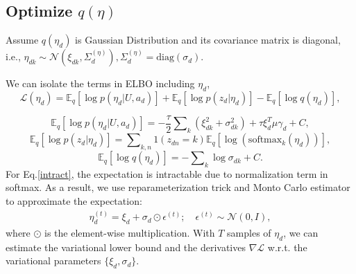 \documentclass[sigconf]{acmart}
\renewcommand*{\bm}[1]{#1}%
\begin{document}
\begin{appendices}
\subsection{Optimize $q(\bm{\eta})$}
Assume $q(\bm{\eta}_d)$ is Gaussian Distribution and its covariance matrix is diagonal, i.e., $\eta_{dk} \sim \mathcal{N}(\xi_{dk}, \Sigma_{d}^{(\eta)}), \Sigma_{d}^{(\eta)} = \text{diag}(\bm{\sigma}_d)$.

We can isolate the terms in ELBO including $\bm{\eta}_d$,
\begin{equation}
\label{ }
\mathcal{L}(\bm{\eta}_d) = \mathbb{E}_q\left[\log p(\bm{\eta}_d | \bm{U}, \bm{a}_d)\right] + \mathbb{E}_q\left[\log p(\bm{z}_d | \bm{\eta}_d) \right] - \mathbb{E}_q\left[\log q(\bm{\eta}_d) \right],
\end{equation}

\begin{equation}
\label{ }
\mathbb{E}_q\left[\log p(\bm{\eta}_d | \bm{U}, \bm{a}_d)\right] = -\frac{\tau}{2}\sum\nolimits_k(\xi_{dk}^2 + \sigma_{dk}^2) + \tau\bm{\xi}_d^T\bm{\mu}\bm{\gamma}_d + C,
\end{equation}
\begin{equation}
\label{intract}
\mathbb{E}_q\left[\log p(\bm{z}_d | \bm{\eta}_d) \right] = \sum\nolimits_{k, n}\bm{1}(z_{dn} = k)\mathbb{E}_q\left[\log (\text{softmax}_k(\bm{\eta}_d))\right],
\end{equation}
\begin{equation}
\label{ }
\mathbb{E}_q\left[\log q(\bm{\eta}_d) \right] = -\sum\nolimits_k\log\sigma_{dk} + C.
\end{equation}
For Eq.\eqref{intract}, the expectation is intractable due to normalization term in softmax. As a result, we use reparameterization trick and Monto Carlo estimator to approximate the expectation:
\begin{equation}
\label{ }
\begin{split}
\bm{\eta}^{(t)}_d = \bm{\xi}_d + \bm{\sigma}_d \odot \bm{\epsilon}^{(t)};\quad \bm{\epsilon}^{(t)} \sim \mathcal{N}(\bm{0},\bm{I}),
\end{split}
\end{equation}
where $\odot$ is the element-wise multiplication. With $T$ samples of $\bm{\eta}_d$, we can estimate the variational lower bound and the derivatives $\nabla\mathcal{L}$ w.r.t. the variational parameters $\{\bm{\xi}_d, \bm{\sigma}_d\}$.


\end{appendices}
\end{document}
